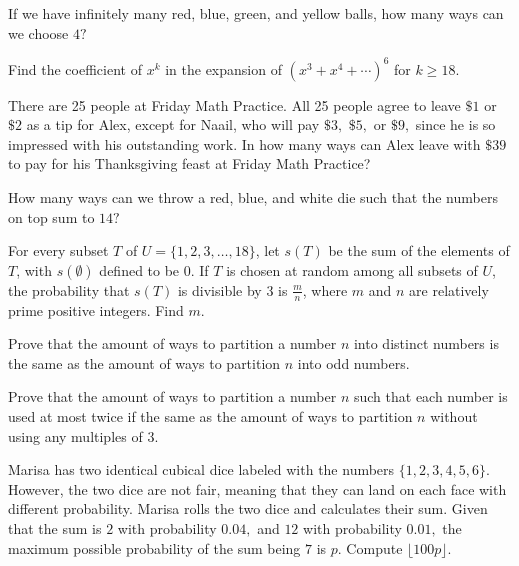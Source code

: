 \documentclass{article}
\begin{document}
\begin{prob}[]{2}
If we have infinitely many red, blue, green, and yellow balls, how many ways can we choose $4?$
\end{prob}

\begin{prob}[]{3}
Find the coefficient of $x^k$ in the expansion of $(x^3+x^4+\cdots)^6$ for $k\geq 18.$
\end{prob}

\begin{prob}[]{3}
There are 25 people at Friday Math Practice. All 25 people agree to leave $\$1$ or $\$2$ as a tip for Alex, except for Naail, who will pay $\$3,$ $\$5,$ or $\$9,$ since he is so impressed with his outstanding work. In how many ways can Alex leave with $\$39$ to pay for his Thanksgiving feast at Friday Math Practice?
\end{prob}


\begin{prob}[]{3}
How many ways can we throw a red, blue, and white die such that the numbers on top sum to $14?$
\end{prob}

\begin{req}[AIME 2018]{4} 
For every subset $T$ of $U = \{ 1,2,3,\ldots,18 \}$, let $s(T)$ be the sum of the elements of $T$, with $s(\emptyset)$ defined to be $0$. If $T$ is chosen at random among all subsets of $U$, the probability that $s(T)$ is divisible by $3$ is $\frac{m}{n}$, where $m$ and $n$ are relatively prime positive integers. Find $m$.
\end{req}

\begin{prob}[]{4}
Prove that the amount of ways to partition a number $n$ into distinct numbers is the same as the amount of ways to partition $n$ into odd numbers.
\end{prob}


\begin{prob}[]{4}
Prove that the amount of ways to partition a number $n$ such that each number is used at most twice if the same as the amount of ways to partition $n$ without using any multiples of $3.$
\end{prob}

\begin{prob}{4}
Marisa has two identical cubical dice labeled with the numbers $\{1,2,3,4,5,6\}.$ However, the two dice are not fair, meaning that they can land on each face with different probability. Marisa rolls the two dice and calculates their sum. Given that the sum is $2$ with probability $0.04,$ and $12$ with probability $0.01,$ the maximum possible probability of the sum being $7$ is $p.$ Compute $\lfloor 100p\rfloor.$
\end{prob}
\end{document}
